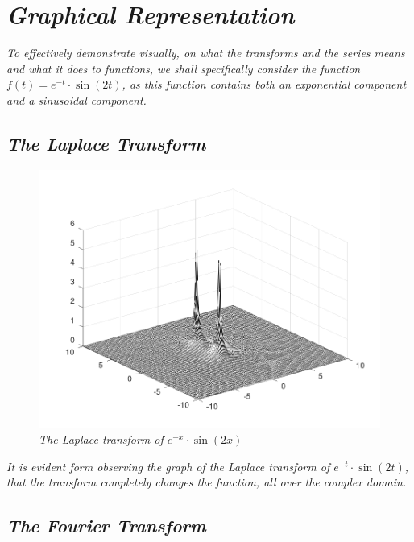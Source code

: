 

\section{\textit{Graphical Representation}}

	\textit{To effectively demonstrate visually, on what the transforms and the series means and what it does to functions, we shall specifically consider the function $f(t) = e^{-t}\cdot\sin\left(2t\right)$, as this function contains both an exponential component and a sinusoidal component.}

	\subsection{\textit{The Laplace Transform}}


			\begin{figure}[H]
			\centering
			\includegraphics[width=15cm]{LapPictures/bk.png}
    		\caption{\textit{The Laplace transform of $e^{-x}\cdot\sin\left(2x\right)$}}
			\end{figure}

		\textit{It is evident form observing the graph of the Laplace transform of $e^{-t}\cdot\sin\left(2t\right)$, that the transform completely changes the function, all over the complex domain.}

	\subsection{\textit{The Fourier Transform}}

